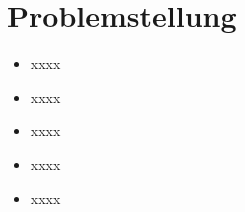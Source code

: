 \section{Problemstellung}

\begin{itemize}

   \item xxxx
   \item xxxx
   \item xxxx
   \item xxxx
   \item xxxx
\end{itemize}








